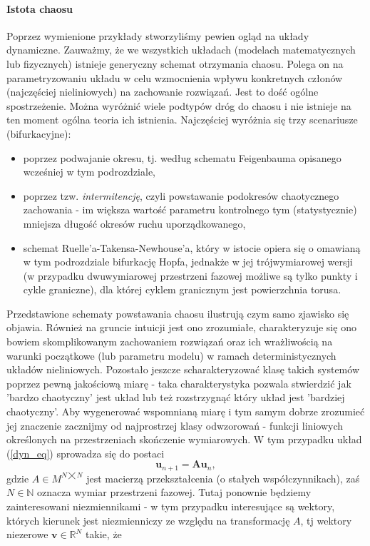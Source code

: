 \documentclass[12pt]{article}
\begin{document}
\paragraph{Istota chaosu} Poprzez wymienione przykłady stworzyliśmy pewien ogląd na układy dynamiczne. Zauważmy, że we wszystkich układach (modelach matematycznych lub fizycznych) istnieje generyczny schemat otrzymania chaosu. Polega on na parametryzowaniu układu w celu wzmocnienia wpływu konkretnych członów (najczęściej nieliniowych) na zachowanie rozwiązań. Jest to dość ogólne spostrzeżenie. Można wyróżnić wiele podtypów dróg do chaosu i nie istnieje na ten moment ogólna teoria ich istnienia. Najczęściej wyróżnia się trzy scenariusze (bifurkacyjne):
\begin{itemize}
	\item poprzez podwajanie okresu, tj. według schematu Feigenbauma opisanego wcześniej w tym podrozdziale,
	\item poprzez tzw. \textit{intermitencję}, czyli powstawanie podokresów chaotycznego zachowania - im większa wartość parametru kontrolnego tym (statystycznie) mniejsza długość okresów ruchu uporządkowanego,
	\item schemat Ruelle'a-Takensa-Newhouse'a, który w istocie opiera się o omawianą w tym podrozdziale bifurkację Hopfa, jednakże w jej trójwymiarowej wersji (w przypadku dwuwymiarowej przestrzeni fazowej możliwe są tylko punkty i cykle graniczne), dla której cyklem granicznym jest powierzchnia torusa.
\end{itemize}
Przedstawione schematy powstawania chaosu ilustrują czym samo zjawisko się objawia. Również na gruncie intuicji jest ono zrozumiałe, charakteryzuje się ono bowiem skomplikowanym zachowaniem rozwiązań oraz ich wrażliwością na warunki początkowe (lub parametru modelu) w ramach deterministycznych układów nieliniowych. \newline 
Pozostało jeszcze scharakteryzować klasę takich systemów poprzez pewną jakościową miarę - taka charakterystyka pozwala stwierdzić jak 'bardzo chaotyczny' jest układ lub też rozstrzygnąć który układ jest 'bardziej chaotyczny'. Aby wygenerować wspomnianą miarę i tym samym dobrze zrozumieć jej znaczenie zacznijmy od najprostrzej klasy odwzorowań - funkcji liniowych określonych na przestrzeniach skończenie wymiarowych. W tym przypadku układ (\ref{dyn_eq}) sprowadza się do postaci
\begin{equation}
	\textbf{u}_{n+1} = \textbf{A}\textbf{u}_{n},
\end{equation}
gdzie $ A \in M^{N \bigtimes N} $ jest macierzą przekształcenia (o stałych współczynnikach), zaś $ N \in \mathbb{N} $ oznacza wymiar przestrzeni fazowej. Tutaj ponownie będziemy zainteresowani niezmiennikami - w tym przypadku interesujące są wektory, których kierunek jest niezmienniczy ze względu na transformację $ A $, tj wektory niezerowe $ \textbf{v} \in \mathbb{R}^{N} $ takie, że
\end{document}
